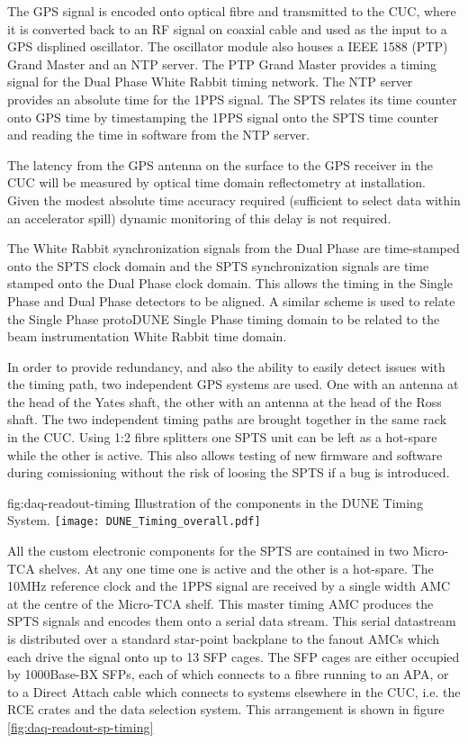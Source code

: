 The GPS signal is encoded onto optical fibre and transmitted to the
CUC, where it is converted back to an RF signal on coaxial cable and
used as the input to a GPS displined oscillator. The oscillator module
also houses a IEEE 1588 (PTP) Grand Master and an NTP server. The PTP
Grand Master provides a timing signal for the Dual Phase White Rabbit
timing network. The NTP server provides an absolute time for the 1PPS
signal. The SPTS relates its time counter onto GPS time by
timestamping the 1PPS signal onto the SPTS time counter and reading
the time in software from the NTP server.

The latency from the GPS antenna on the surface to the GPS receiver in
the CUC will be measured by optical time domain reflectometry at
installation. Given the modest absolute time accuracy required
(sufficient to select data within an accelerator spill) dynamic
monitoring of this delay is not required.

The White Rabbit synchronization signals from the Dual Phase are
time-stamped onto the SPTS clock domain and the SPTS synchronization
signals are time stamped onto the Dual Phase clock domain. This allows
the timing in the Single Phase and Dual Phase detectors to be
aligned. A similar scheme is used to relate the Single Phase protoDUNE
Single Phase timing domain to be related to the beam instrumentation
White Rabbit time domain.

In order to provide redundancy, and also the ability to easily detect
issues with the timing path, two independent GPS systems are used. One
with an antenna at the head of the Yates shaft, the other with an
antenna at the head of the Ross shaft. The two independent timing
paths are brought together in the same rack in the CUC. Using 1:2
fibre splitters one SPTS unit can be left as a hot-spare while the
other is active. This also allows testing of new firmware and software
during comissioning without the risk of loosing the SPTS if a bug is
introduced.


\begin{dunefigure}{fig:daq-readout-timing}
  {Illustration of the components in the DUNE Timing System.}
\texttt{[image: DUNE\_Timing\_overall.pdf]}
\end{dunefigure}

All the custom electronic components for the SPTS are contained in two
Micro-TCA shelves. At any one time one is active and the other is a
hot-spare. The 10MHz reference clock and the 1PPS signal are received
by a single width AMC at the centre of the Micro-TCA shelf. This
master timing AMC produces the SPTS signals and encodes them onto a
serial data stream. This serial datastream is distributed over a
standard star-point backplane to the fanout AMCs which each drive the
signal onto up to 13 SFP cages. The SFP cages are either occupied by
1000Base-BX SFPs, each of which connects to a fibre running to an APA,
or to a Direct Attach cable which connects to systems elsewhere in the
CUC, i.e. the RCE crates and the data selection system. This
arrangement is shown in figure \ref{fig:daq-readout-sp-timing}


